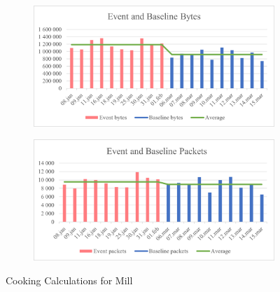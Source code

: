 \begin{figure}[H]
    \centering
    \begin{subfigure}{1\textwidth}
        \centering
        \includegraphics[width=1\hsize]{figures/Mill_Cooking_Calculations_Bytes.png} 
    \end{subfigure}
    \begin{subfigure}{1\textwidth}
        \centering
        \includegraphics[width=1\hsize]{figures/Mill_Cooking_Calculations_Packets.png} 
    \end{subfigure}
    \caption{Cooking Calculations for Mill}
    \label{fig:MillCookingCalculations}
\end{figure}

